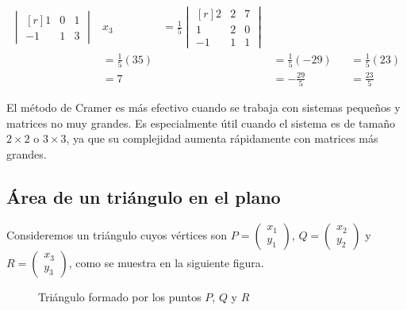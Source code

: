 \begin{example}
\begin{align*}
\begin{vmatrix*}[r]
            1 & 0 & 1 \\
            -1 & 1 & 3
        \end{vmatrix*} & x_3 & = \frac{1}{5} \begin{vmatrix*}[r]
            2 & 2 & 7 \\
            1 & 2 & 0 \\
            -1 & 1 & 1
        \end{vmatrix*} \\
        & = \frac{1}{5} (35) & & = \frac{1}{5} (-29) & & = \frac{1}{5} (23) \\
        & = 7 & & = -\frac{29}{5} & & = \frac{23}{5}
    \end{align*}
\end{example}

\newpage

\begin{remark}
    El método de Cramer es más efectivo cuando se trabaja con sistemas pequeños y matrices no muy grandes. Es especialmente útil cuando el sistema es de tamaño $2 \times 2$ o $3 \times 3$, ya que su complejidad aumenta rápidamente con matrices más grandes.
\end{remark}

\subsection{Área de un triángulo en el plano}

Consideremos un triángulo cuyos vértices son $P = \begin{pmatrix}
    x_1 \\
    y_1
\end{pmatrix}$, $Q = \begin{pmatrix}
    x_2 \\
    y_2
\end{pmatrix}$ y $R = \begin{pmatrix}
    x_3 \\
    y_3
\end{pmatrix}$, como se muestra en la siguiente figura.
\begin{figure}[h!]
    \centering
    \caption{Triángulo formado por los puntos $P$, $Q$ y $R$}\label{IISISJSNSKSOOSJJKKSKS}
\end{figure}

